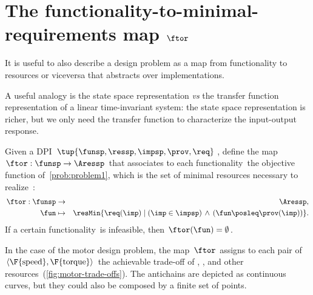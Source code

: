 

\section{The functionality-to-minimal-requirements map $\ftor$}

It is useful to also describe a design problem as a map from functionality
to resources or viceversa that abstracts over implementations.

A useful analogy is the state space representation \emph{vs} the
transfer function representation of a linear time-invariant system:
the state space representation is richer, but we only need the transfer
function to characterize the input-output response.


\begin{definition}
    \label{def:ftor}Given a DPI $\tup{ \funsp,\ressp,\impsp,\prov,\req} $,
    define the map~$\ftor:\funsp\rightarrow\Aressp$ that associates
    to each functionality~\fun the objective function of~\cref{prob:problem1},
    which is the set of minimal resources necessary to realize~\fun:
    \begin{eqnarray*}
        \ftor:\funsp & \rightarrow & \Aressp,\\
        \fun& \mapsto & \resMin\{\req(\imp)\mid\left(\imp\in\impsp\right)\,\wedge\,\left(\fun\posleq\prov(\imp)\right)\}.
    \end{eqnarray*}
    If a certain functionality~\fun is infeasible, then $\ftor(\fun)=\emptyset$.
\end{definition}



\begin{example}
    In the case of the motor design problem, the map~$\ftor$ assigns
    to each pair of $\left\langle \F{\text{speed}},\F{\text{torque}}\right\rangle $
    the achievable trade-off of , , and other resources~(\cref{fig:motor-trade-offs}).
    The antichains are depicted as continuous curves, but they could also
    be composed by a finite set of points.

\end{example}

